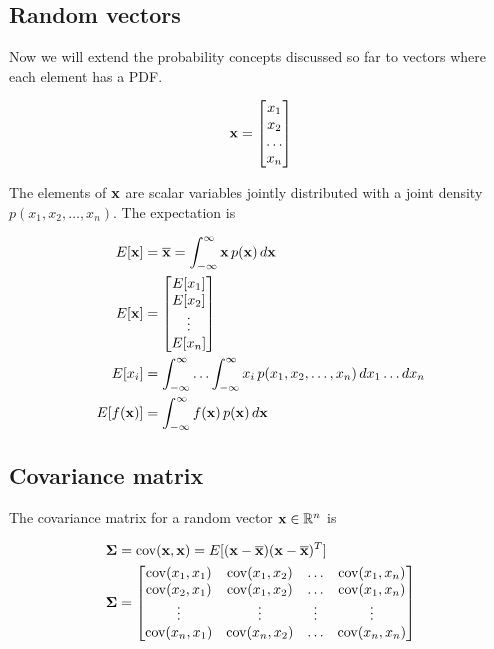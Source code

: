 \subsection{Random vectors}

Now we will extend the probability concepts discussed so far to vectors where
each element has a PDF.

\begin{equation*}
  \mathbf{x} = \begin{bmatrix}
    x_1 \\
    x_2 \\
    \ldots \\
    x_n
  \end{bmatrix}
\end{equation*}

The elements of $\mathbf{x}$ are scalar variables jointly distributed with a joint
density $p(x_1, x_2, \ldots, x_n)$. The expectation is

\begin{align*}
  E[\mathbf{x}] &= \overline{\mathbf{x}} = \int_{-\infty}^\infty \mathbf{x} \,p(\mathbf{x})
    \,d\mathbf{x} \\
  E[\mathbf{x}] &= \begin{bmatrix}
    E[x_1] \\
    E[x_2] \\
    \vdots \\
    E[x_n]
  \end{bmatrix} \\
  E[x_i] &= \int_{-\infty}^\infty \ldots \int_{-\infty}^\infty x_i
    \,p(x_1, x_2, \ldots, x_n) \,dx_1 \ldots dx_n \\
  E[f(\mathbf{x})] &= \int_{-\infty}^\infty f(\mathbf{x}) \,p(\mathbf{x}) \,d\mathbf{x}
\end{align*}

\subsection{Covariance matrix}

The covariance matrix for a random vector $\mathbf{x} \in \mathbb{R}^n$ is

\begin{align*}
  \mathbf{\Sigma} &= \operatorname{cov}(\mathbf{x}, \mathbf{x}) = E[(\mathbf{x} - \overline{\mathbf{x}})
    (\mathbf{x} - \overline{\mathbf{x}})^T] \\
  \mathbf{\Sigma} &= \begin{bmatrix}
    \operatorname{cov}(x_1, x_1) & \operatorname{cov}(x_1, x_2) & \ldots & \operatorname{cov}(x_1, x_n) \\
    \operatorname{cov}(x_2, x_1) & \operatorname{cov}(x_1, x_2) & \ldots & \operatorname{cov}(x_1, x_n) \\
    \vdots        & \vdots        & \vdots & \vdots \\
    \operatorname{cov}(x_n, x_1) & \operatorname{cov}(x_n, x_2) & \ldots & \operatorname{cov}(x_n, x_n) \\
  \end{bmatrix}
\end{align*}

